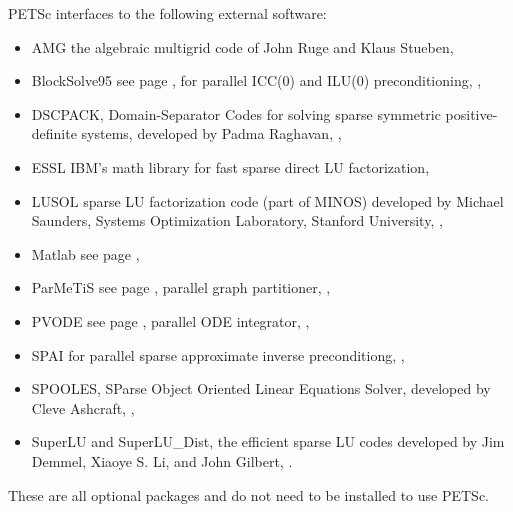 \vspace{.3in}
\noindent
PETSc interfaces to the following external software:
\begin{itemize}
  \item AMG          the algebraic multigrid code of John Ruge and Klaus Stueben,
  \item BlockSolve95 see page \pageref{sec_blocksolve}, for parallel ICC(0) and ILU(0) preconditioning,
                     ,
  \item DSCPACK,     Domain-Separator Codes for solving sparse symmetric positive-definite systems, 
                     developed by Padma Raghavan,   
                     ,
  \item ESSL         IBM's math library for fast sparse direct LU factorization,
  \item LUSOL        sparse LU factorization code (part of MINOS) developed by Michael Saunders,
                      Systems Optimization Laboratory, Stanford University,
                     ,
  \item Matlab       see page \pageref{ch_matlab},
  \item ParMeTiS      see page \pageref{sec_partitioning}, parallel graph partitioner,
                     ,
  \item PVODE        see page \pageref{sec_pvode}, parallel ODE integrator,
                     ,
  \item SPAI         for parallel sparse approximate inverse preconditiong, 
                     ,
  \item SPOOLES, SParse Object Oriented Linear Equations Solver, developed by Cleve Ashcraft, 
                    ,
  \item SuperLU and SuperLU\_Dist, the efficient sparse LU codes developed by Jim Demmel,  Xiaoye S. Li, and John Gilbert, 
                    .
\end{itemize}
These are all optional packages and do not need to be installed to use PETSc.


